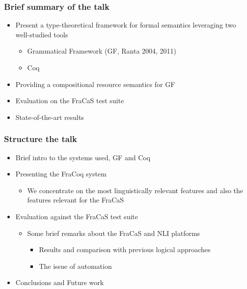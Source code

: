 \documentclass[11pt]{beamer}
\author{Jean-Philippe Bernardy and Stergios Chatzikyriakidis}
\begin{document}
\date{September 20, 2017}
\frame{\titlepage}
\begin{frame}[fragile]
	\frametitle{Brief summary of the talk}
	
	
	\begin{itemize}
		\item  Present a type-theoretical framework for formal semantics leveraging two well-studied tools
		\begin{itemize}
			\item Grammatical Framework (GF, Ranta 2004, 2011)
			\item Coq 
			

		
		
			
			
			
		
	
		
	\end{itemize}
	\item Providing a compositional resource semantics for GF
	
	\item Evaluation on the FraCaS test suite
	
	\item State-of-the-art results	\end{itemize}
\end{frame}

\begin{frame}[fragile]
	\frametitle{Structure the talk}
	
	\begin{itemize}
		\item Brief intro to the systems used, GF and Coq
		
		\item Presenting the FraCoq system
		
		\begin{itemize}
			\item We concentrate on the most linguistically relevant features and also the features relevant for the FraCaS
			
\end{itemize}
	
	\item Evaluation against the FraCaS test suite
	
	\begin{itemize}
		\item Some brief remarks about the FraCaS and NLI platforms
			\begin{itemize}
			
			\item Results and comparison with previous logical approaches
			
			\item The issue of automation
			
\end{itemize}\end{itemize}
						
						\item Conclusions and Future work
		
\end{itemize}
\end{frame}
\end{document}
